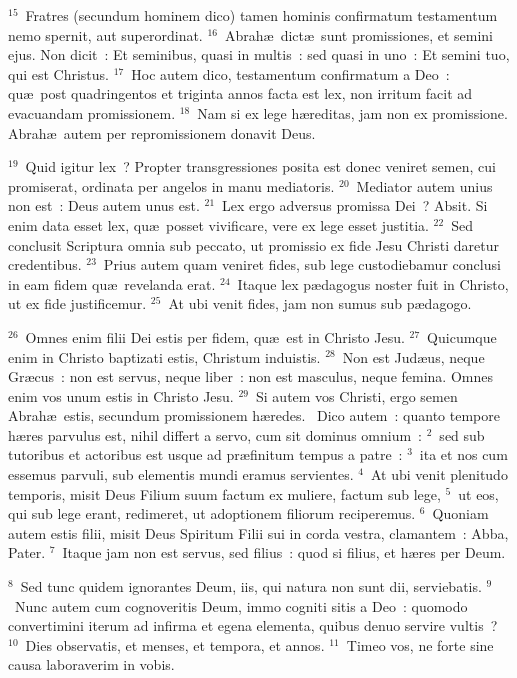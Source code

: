 ${}^{15}$~Fratres (secundum hominem dico) tamen hominis confirmatum testamentum nemo spernit, aut superordinat.
${}^{16}$~Abrah\ae\ dict\ae\ sunt promissiones, et semini ejus. Non dicit~: Et seminibus, quasi in multis~: sed quasi in uno~: Et semini tuo, qui est Christus.
${}^{17}$~Hoc autem dico, testamentum confirmatum a Deo~: qu\ae\ post quadringentos et triginta annos facta est lex, non irritum facit ad evacuandam promissionem.
${}^{18}$~Nam si ex lege h\ae reditas, jam non ex promissione. Abrah\ae\ autem per repromissionem donavit Deus.


${}^{19}$~Quid igitur lex~? Propter transgressiones posita est donec veniret semen, cui promiserat, ordinata per angelos in manu mediatoris.
${}^{20}$~Mediator autem unius non est~: Deus autem unus est.
${}^{21}$~Lex ergo adversus promissa Dei~? Absit. Si enim data esset lex, qu\ae\ posset vivificare, vere ex lege esset justitia.
${}^{22}$~Sed conclusit Scriptura omnia sub peccato, ut promissio ex fide Jesu Christi daretur credentibus.
${}^{23}$~Prius autem quam veniret fides, sub lege custodiebamur conclusi in eam fidem qu\ae\ revelanda erat.
${}^{24}$~Itaque lex p\ae dagogus noster fuit in Christo, ut ex fide justificemur.
${}^{25}$~At ubi venit fides, jam non sumus sub p\ae dagogo.


${}^{26}$~Omnes enim filii Dei estis per fidem, qu\ae\ est in Christo Jesu.
${}^{27}$~Quicumque enim in Christo baptizati estis, Christum induistis.
${}^{28}$~Non est Jud\ae us, neque Gr\ae cus~: non est servus, neque liber~: non est masculus, neque femina. Omnes enim vos unum estis in Christo Jesu.
${}^{29}$~Si autem vos Christi, ergo semen Abrah\ae\ estis, secundum promissionem h\ae redes.
~Dico autem~: quanto tempore h\ae res parvulus est, nihil differt a servo, cum sit dominus omnium~:
${}^{2}$~sed sub tutoribus et actoribus est usque ad pr\ae finitum tempus a patre~:
${}^{3}$~ita et nos cum essemus parvuli, sub elementis mundi eramus servientes.
${}^{4}$~At ubi venit plenitudo temporis, misit Deus Filium suum factum ex muliere, factum sub lege,
${}^{5}$~ut eos, qui sub lege erant, redimeret, ut adoptionem filiorum reciperemus.
${}^{6}$~Quoniam autem estis filii, misit Deus Spiritum Filii sui in corda vestra, clamantem~: Abba, Pater.
${}^{7}$~Itaque jam non est servus, sed filius~: quod si filius, et h\ae res per Deum.


${}^{8}$~Sed tunc quidem ignorantes Deum, iis, qui natura non sunt dii, serviebatis.
${}^{9}$~Nunc autem cum cognoveritis Deum, immo cogniti sitis a Deo~: quomodo convertimini iterum ad infirma et egena elementa, quibus denuo servire vultis~?
${}^{10}$~Dies observatis, et menses, et tempora, et annos.
${}^{11}$~Timeo vos, ne forte sine causa laboraverim in vobis.


